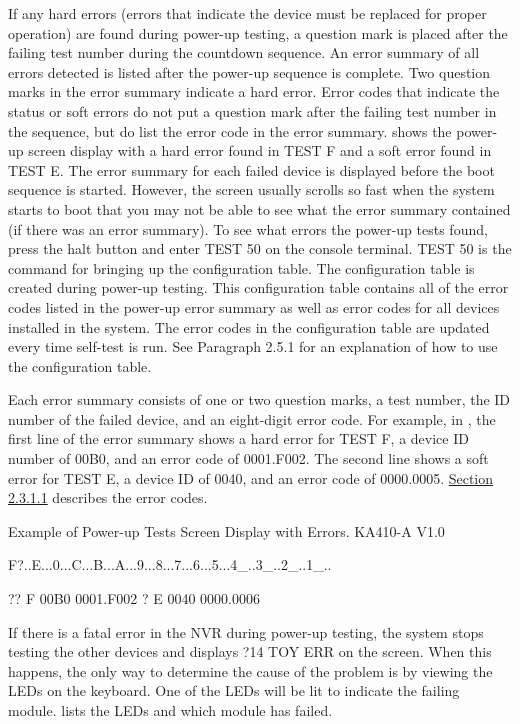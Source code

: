 If any hard errors (errors that indicate the device must be replaced for
proper operation) are found during power-up testing, a question mark is
placed after the failing test number during the countdown sequence. An
error summary of all errors detected is listed after the power-up sequence
is complete. Two question marks in the error summary indicate a hard error.
Error codes that indicate the status or soft errors do not put a question mark
after the failing test number in the sequence, but do list the error code in the
error summary.  shows the power-up screen display with a hard
error found in TEST F and a soft error found in TEST E. The error summary
for each failed device is displayed before the boot sequence is started.
However, the screen usually scrolls so fast when the system starts to boot
that you may not be able to see what the error summary contained (if there
was an error summary). To see what errors the power-up tests found, press
the halt button and enter TEST 50 on the console terminal. TEST 50 is the
command for bringing up the configuration table. The configuration table
is created during power-up testing. This configuration table contains all of
the error codes listed in the power-up error summary as well as error codes
for all devices installed in the system. The error codes in the configuration
table are updated every time self-test is run. See Paragraph 2.5.1 for an
explanation of how to use the configuration table.

Each error summary consists of one or two question marks, a test number,
the ID number of the failed device, and an eight-digit error code. For example, 
in , the first line of the error summary shows a hard error
for TEST F, a device ID number of 00B0, and an error code of 0001.F002.
The second line shows a soft error for TEST E, a device ID of 0040, and an
error code of 0000.0005. \hyperlink{subsubsection.2.3.1.1}{Section 2.3.1.1} describes the error codes.
\newpage
\begin{ttfig}{Example of Power-up Tests Screen Display with Errors.}
KA410-A V1.0

F?..E...0...C...B...A...9...8...7...6...5...4_..3_..2_..1_..

?? F  00B0  0001.F002
 ? E  0040  0000.0006
\end{ttfig}

If there is a fatal error in the NVR during power-up testing, the system stops
testing the other devices and displays ?14 TOY ERR on the screen. When
this happens, the only way to determine the cause of the problem is by
viewing the LEDs on the keyboard. One of the LEDs will be lit to indicate
the failing module.  lists the LEDs and which module has failed.

